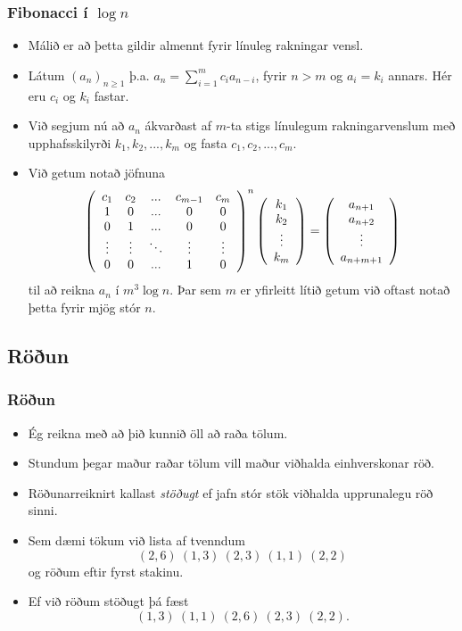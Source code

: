 \documentclass{beamer}
\begin{document}
\begin{frame}
	\frametitle{Fibonacci í $\log n$}
	\begin{itemize}
		\item<1-> Málið er að þetta gildir almennt fyrir línuleg rakningar vensl.
		\item<2-> Látum $(a_n)_{n \geq 1}$ þ.a. $a_n = \sum_{i = 1}^{m}c_ia_{n - i}$, fyrir $n > m$
			og $a_i = k_i$ annars. Hér eru $c_i$ og $k_i$ fastar.
		\item<3-> Við segjum nú að $a_n$ ákvarðast af $m$-ta stigs línulegum rakningarvenslum með upphafsskilyrði
			$k_1, k_2, ..., k_m$ og fasta $c_1, c_2, ..., c_m$.
		\item<4-> Við getum notað jöfnuna 
			\[
				\left (
				\begin{array}{c c c c c}
					c_1 & c_2 & ... & c_{m - 1} & c_m\\
					1   & 0   & ... & 0 & 0\\
					0   & 1   & ... & 0 & 0\\
					\vdots & \vdots & \ddots & \vdots & \vdots\\
					0   & 0   & ... & 1 & 0\\
				\end{array}
				\right )^n
				\left (
				\begin{array}{c}
					k_1\\
					k_2\\
					\vdots\\
					k_m
				\end{array}
				\right )
				=
				\left (
				\begin{array}{c}
					a_{n + 1}\\
					a_{n + 2}\\
					\vdots\\
					a_{n + m + 1}
				\end{array}
				\right )
			\]
			til að reikna $a_n$ í $m^3 \log n$. Þar sem $m$ er yfirleitt lítið getum við oftast notað þetta fyrir mjög stór $n$.
	\end{itemize}
\end{frame}

\subsection{Röðun}

\begin{frame}
	\frametitle{Röðun}
	\begin{itemize}
		\item<1-> Ég reikna með að þið kunnið öll að raða tölum.
		\item<2-> Stundum þegar maður raðar tölum vill maður viðhalda einhverskonar röð.
		\item<3-> Röðunarreiknirt kallast \emph{stöðugt} ef jafn stór stök viðhalda upprunalegu röð sinni.
		\item<4-> Sem dæmi tökum við lista af tvenndum
			\[
				(2, 6)\ (1, 3)\ (2, 3)\ (1, 1)\ (2, 2)
			\]
			og röðum eftir fyrst stakinu.
		\item<5-> Ef við röðum stöðugt þá fæst
			\[
				(1, 3)\ (1, 1)\ (2, 6)\ (2, 3)\ (2, 2).
			\]
	\end{itemize}
\end{frame}
\end{document}

